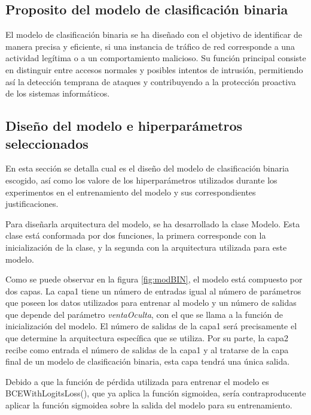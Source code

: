
\subsection{Proposito del modelo de clasificación binaria}
El modelo de clasificación binaria se ha diseñado con el objetivo de identificar de manera precisa y eficiente, si una instancia de tráfico de red corresponde a una actividad legítima o a un comportamiento malicioso. Su función principal consiste en distinguir entre accesos normales y posibles intentos de intrusión, permitiendo así la detección temprana de ataques y contribuyendo a la protección proactiva de los sistemas informáticos.

\subsection{Diseño del modelo e hiperparámetros seleccionados} \label{sec:disBIN}
En esta sección se detalla cual es el diseño del modelo de clasificación binaria escogido, así como los valore de los hiperparámetros utilizados durante los experimentos en el entrenamiento del modelo y sus correspondientes justificaciones.

Para diseñarla arquitectura del modelo, se ha desarrollado la clase Modelo. Esta clase está conformada por dos funciones, la primera corresponde con la inicialización de la clase, y la segunda con la arquitectura utilizada para este modelo.

Como se puede observar en la figura \ref{fig:modBIN}, el modelo está compuesto por dos capas. La capa1 tiene un número de entradas igual al número de parámetros que poseen los datos utilizados para entrenar al modelo y un número de salidas que depende del parámetro \textit{ventaOculta}, con el que se llama a la función de inicialización del modelo. El número de salidas de la capa1 será precisamente el que determine la arquitectura específica que se utiliza. Por su parte, la capa2 recibe como entrada el número de salidas de la capa1 y al tratarse de la capa final de un modelo de clasificación binaria, esta capa tendrá una única salida.

Debido a que la función de pérdida utilizada para entrenar el modelo es BCEWithLogitsLoss(), que ya aplica la función sigmoidea, sería contraproducente aplicar la función sigmoidea sobre la salida del modelo para su entrenamiento.


